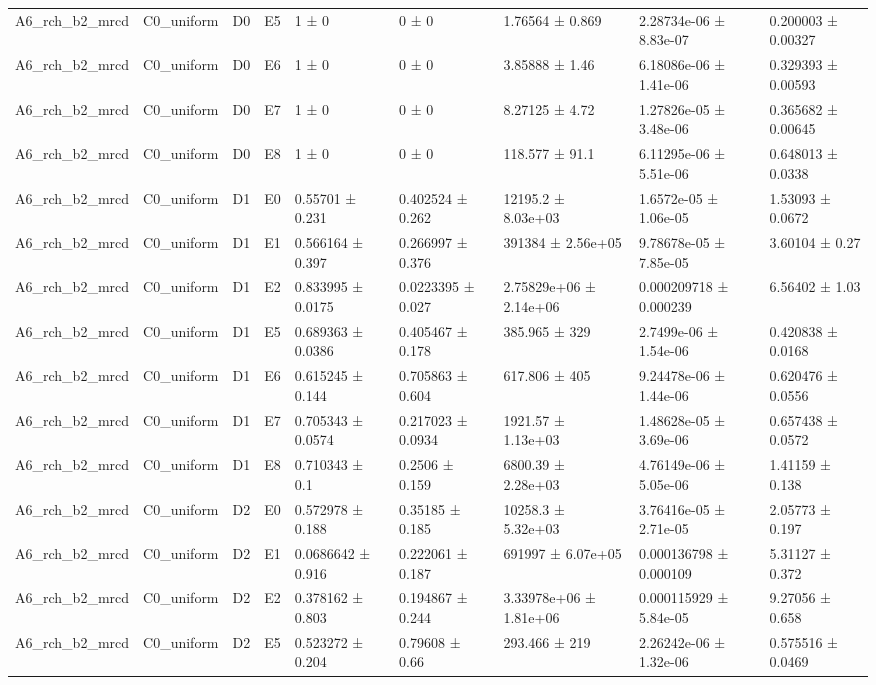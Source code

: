\begin{table}
\begin{tabular}{lllllllll}
A6\_rch\_b2\_mrcd & C0\_uniform & D0 & E5 & 1 ± 0 & 0 ± 0 & 1.76564 ± 0.869 & 2.28734e-06 ± 8.83e-07 & 0.200003 ± 0.00327 \\
A6\_rch\_b2\_mrcd & C0\_uniform & D0 & E6 & 1 ± 0 & 0 ± 0 & 3.85888 ± 1.46 & 6.18086e-06 ± 1.41e-06 & 0.329393 ± 0.00593 \\
A6\_rch\_b2\_mrcd & C0\_uniform & D0 & E7 & 1 ± 0 & 0 ± 0 & 8.27125 ± 4.72 & 1.27826e-05 ± 3.48e-06 & 0.365682 ± 0.00645 \\
A6\_rch\_b2\_mrcd & C0\_uniform & D0 & E8 & 1 ± 0 & 0 ± 0 & 118.577 ± 91.1 & 6.11295e-06 ± 5.51e-06 & 0.648013 ± 0.0338 \\
A6\_rch\_b2\_mrcd & C0\_uniform & D1 & E0 & 0.55701 ± 0.231 & 0.402524 ± 0.262 & 12195.2 ± 8.03e+03 & 1.6572e-05 ± 1.06e-05 & 1.53093 ± 0.0672 \\
A6\_rch\_b2\_mrcd & C0\_uniform & D1 & E1 & 0.566164 ± 0.397 & 0.266997 ± 0.376 & 391384 ± 2.56e+05 & 9.78678e-05 ± 7.85e-05 & 3.60104 ± 0.27 \\
A6\_rch\_b2\_mrcd & C0\_uniform & D1 & E2 & 0.833995 ± 0.0175 & 0.0223395 ± 0.027 & 2.75829e+06 ± 2.14e+06 & 0.000209718 ± 0.000239 & 6.56402 ± 1.03 \\
A6\_rch\_b2\_mrcd & C0\_uniform & D1 & E5 & 0.689363 ± 0.0386 & 0.405467 ± 0.178 & 385.965 ± 329 & 2.7499e-06 ± 1.54e-06 & 0.420838 ± 0.0168 \\
A6\_rch\_b2\_mrcd & C0\_uniform & D1 & E6 & 0.615245 ± 0.144 & 0.705863 ± 0.604 & 617.806 ± 405 & 9.24478e-06 ± 1.44e-06 & 0.620476 ± 0.0556 \\
A6\_rch\_b2\_mrcd & C0\_uniform & D1 & E7 & 0.705343 ± 0.0574 & 0.217023 ± 0.0934 & 1921.57 ± 1.13e+03 & 1.48628e-05 ± 3.69e-06 & 0.657438 ± 0.0572 \\
A6\_rch\_b2\_mrcd & C0\_uniform & D1 & E8 & 0.710343 ± 0.1 & 0.2506 ± 0.159 & 6800.39 ± 2.28e+03 & 4.76149e-06 ± 5.05e-06 & 1.41159 ± 0.138 \\
A6\_rch\_b2\_mrcd & C0\_uniform & D2 & E0 & 0.572978 ± 0.188 & 0.35185 ± 0.185 & 10258.3 ± 5.32e+03 & 3.76416e-05 ± 2.71e-05 & 2.05773 ± 0.197 \\
A6\_rch\_b2\_mrcd & C0\_uniform & D2 & E1 & 0.0686642 ± 0.916 & 0.222061 ± 0.187 & 691997 ± 6.07e+05 & 0.000136798 ± 0.000109 & 5.31127 ± 0.372 \\
A6\_rch\_b2\_mrcd & C0\_uniform & D2 & E2 & 0.378162 ± 0.803 & 0.194867 ± 0.244 & 3.33978e+06 ± 1.81e+06 & 0.000115929 ± 5.84e-05 & 9.27056 ± 0.658 \\
A6\_rch\_b2\_mrcd & C0\_uniform & D2 & E5 & 0.523272 ± 0.204 & 0.79608 ± 0.66 & 293.466 ± 219 & 2.26242e-06 ± 1.32e-06 & 0.575516 ± 0.0469 \\

\end{tabular}
\end{table}
